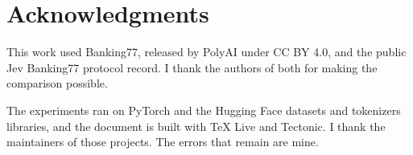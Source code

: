 \chapter*{Acknowledgments}

This work used Banking77, released by PolyAI under CC BY 4.0, and the public
Jev Banking77 protocol record. I thank the authors of both for making the
comparison possible.

The experiments ran on PyTorch and the Hugging Face datasets and tokenizers
libraries, and the document is built with TeX Live and Tectonic. I thank the
maintainers of those projects. The errors that remain are mine.
